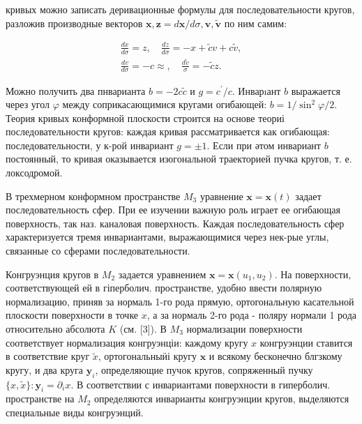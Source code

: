 \documentclass[10pt]{article}
\begin{document}
кривых можно записать деривационные формулы для последовательности кругов, разложив производные векторов $\boldsymbol{x}, \boldsymbol{z}=d \boldsymbol{x} / d \sigma, \boldsymbol{v}, \tilde{\boldsymbol{v}}$ по ним самим:



\[

\begin{gathered}

\frac{d x}{d \sigma}=z, \quad \frac{d z}{d \sigma}=-x+\tilde{c} v+c \tilde{v}, \\

\frac{d v}{d \sigma}=-c \approx, \quad \frac{d \tilde{v}}{\sigma}=-\tilde{c} z .

\end{gathered}

\]



Можно получить два пнварианта $b=-2 c \tilde{c}$ и $g=c^{\prime} / c$. Инварıант $b$ выражается через угол $\varphi$ между соприкасающимися кругами огибающей: $b=1 / \sin ^{2} \varphi / 2$. Теория кривых конформной плоскости строится на основе теориі последовательности кругов: каждая кривая рассматривается как огибающая: последовательности, у к-рой инвариант $g= \pm 1$. Если при әтом инвариант $b$ постоянный, то кривая оказывается изогональной траекторией пучка кругов, т. е. локсодромой.



В трехмерном конформном пространстве $M_{3}$ уравнение $\boldsymbol{x}=\boldsymbol{x}(t)$ задает последовательность сфер. При ее изучении важную роль играет ее огибающая поверхность, так наз. каналовая поверхность. Каждая последовательность сфер характеризуется тремя инвариантами, выражающимися через нек-рые углы, связанные со сферами последовательности.



Конгруэнция кругов в $M_{2}$ задается уравнением $\boldsymbol{x}=\boldsymbol{x}\left(u_{1}, u_{2}\right)$. На поверхности, соответствующей ей в гіперболич. пространстве, удобно ввести полярную нормализацию, приняв за нормаль 1-го рода прямую, ортогональную касательной плоскости поверхности в точке $x$, а за нормаль 2-го рода - поляру нормали 1 рода относительно абсолюта $K$ (см. [3]). В $M_{3}$ нормализации поверхности соответствует нормализация конгруэнціи: каждому кругу $x$ конгруэнции ставится в соответствие круг $\tilde{x}$, ортогональныӥі кругу $\boldsymbol{x}$ и всякому бесконечно блгзкому кругу, и два круга $\boldsymbol{y}_{i}$, определяющие пучок кругов, сопряженный пучку $\{x, \tilde{x}\}: \boldsymbol{y}_{i}=\partial_{i} x$. В соответствии с инвариантами поверхности в гиперболич. пространстве на $M_{2}$ определяются инварианты конгруэнции кругов, выделяются специальные виды конгруэнций.
\end{document}
